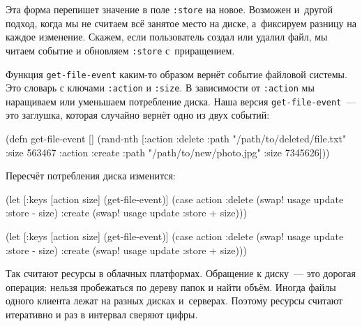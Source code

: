 Эта форма перепишет значение в поле \verb|:store| на новое. Возможен и~другой
подход, когда мы не считаем всё занятое место на диске, а~фиксируем разницу на
каждое изменение. Скажем, если пользователь создал или удалил файл, мы читаем
событие и обновляем \verb|:store| с~приращением.

Функция \verb|get-file-event| каким-то образом вернёт событие файловой
системы. Это словарь с ключами \verb|:action| и \verb|:size|. В зависимости
от \verb|:action| мы наращиваем или уменьшаем потребление диска. Наша версия
\texttt{get-file\--event}~--- это заглушка, которая случайно вернёт одно из двух
событий:

\begin{english}
  \begin{clojure}
(defn get-file-event []
  (rand-nth
   [{:action :delete
     :path "/path/to/deleted/file.txt"
     :size 563467}
    {:action :create
     :path "/path/to/new/photo.jpg"
     :size 7345626}]))
  \end{clojure}
\end{english}

\noindent
Пересчёт потребления диска изменится:

\ifx\DEVICETYPE\MOBILE

\begin{english}
  \begin{clojure}
(let [{:keys [action size]}
      (get-file-event)]
  (case action
    :delete
    (swap! usage update :store - size)
    :create
    (swap! usage update :store + size)))
  \end{clojure}
\end{english}

\else

\begin{english}
  \begin{clojure}
(let [{:keys [action size]} (get-file-event)]
  (case action
    :delete
    (swap! usage update :store - size)
    :create
    (swap! usage update :store + size)))
  \end{clojure}
\end{english}

\fi


Так считают ресурсы в облачных платформах. Обращение к диску~--- это дорогая
операция: нельзя пробежаться по дереву папок и найти объём. Иногда файлы
одного клиента лежат на разных дисках и~серверах. Поэтому ресурсы считают
итеративно и раз в интервал сверяют цифры.

